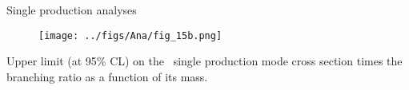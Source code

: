 \begin{frame}{Single production analyses}
\vspace{-.2cm}
\begin{figure}[!Hhtbp]
  \begin{center}
    \texttt{[image: ../figs/Ana/fig\_15b.png]}
  \end{center}
\end{figure}

\vspace{-.2cm}
    \begin{block}{}
      \tiny \centering Upper limit (at 95\% CL) on the \Tp~single production mode cross section times the branching ratio as a function of its mass.
    \end{block}

\end{frame}

